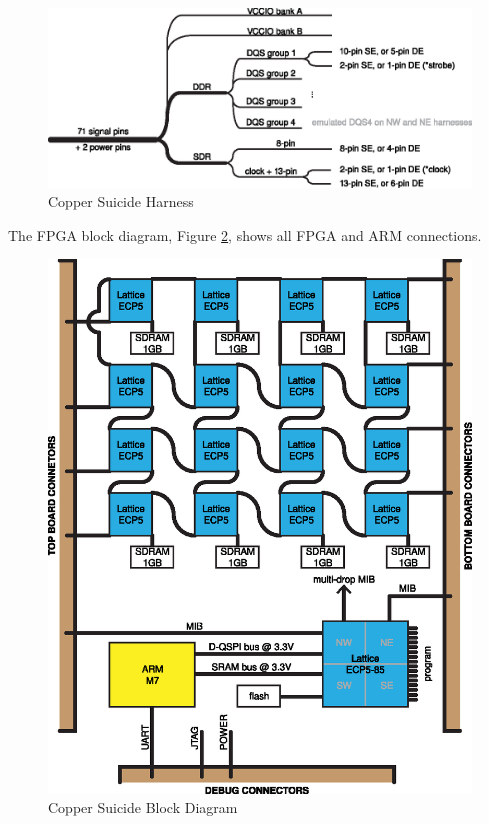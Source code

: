 \documentclass{article}
\begin{document}
\begin{figure}[H]
  \centering
  \includegraphics[scale=1]{cs_harness.eps}
	\caption{Copper Suicide Harness}
	\label{fig:harness}
\end{figure}

The FPGA block diagram, Figure \ref{fig:blockdiagram}, shows all FPGA and ARM connections.

\begin{figure}[H]
  \centering
  \includegraphics[scale=1]{cs_block_diagram.eps}
	\caption{Copper Suicide Block Diagram}
	\label{fig:blockdiagram}
\end{figure}
\end{document}
